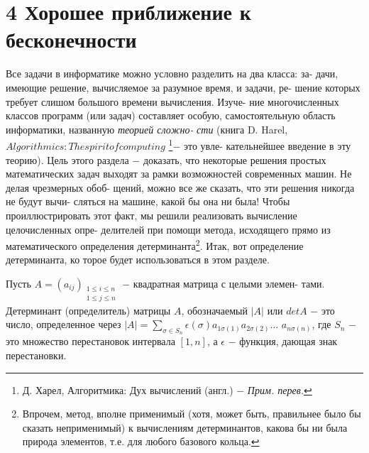 \section{4 Хорошее приближение к бесконечности}
\noindent
Все задачи в информатике можно условно разделить на два класса: за-\linebreak
дачи, имеющие решение, вычисляемое за разумное время, и задачи, ре-\linebreak
шение которых требует слишом большого времени вычисления. Изуче-\linebreak
ние многочисленных классов программ (или задач) составляет особую,\linebreak
самостоятельную область информатики,  названную \textit{теорией сложно-}\linebreak
\textit{сти} (книга D. Harel, $Algorithmics: The spirit of computing$
\footnote{
Д. Харел, Алгоритмика: Дух вычислений (англ.) $-$ \textit{Прим. перев.}}$-$ это увле-\linebreak
кательнейшее введение в эту теорию). Цель этого раздела $-$ доказать,\linebreak
что  некоторые  решения  простых  математических  задач  выходят  за\linebreak
рамки возможностей современных машин. Не делая чрезмерных обоб-\linebreak
щений, можно все же сказать, что эти решения никогда не будут вычи-\linebreak
сляться на машине, какой бы она ни была! Чтобы проиллюстрировать\linebreak
этот факт,  мы  решили  реализовать  вычисление  целочисленных  опре-\linebreak
делителей при помощи метода, исходящего прямо из математического\linebreak
определения детерминанта\footnote{
Впрочем, метод, вполне применимый (хотя, может быть, правильнее было бы\linebreak
сказать неприменимый) к вычислениям детерминантов, какова бы ни была природа\linebreak
элементов, т.е. для любого базового кольца.}. Итак, вот определение детерминанта, ко­
торое будет использоваться в этом разделе.
\begin{determ}
\hspace*{15pt}Пусть $A=(a_{ij})_{\substack{1\leqslant{i}\leqslant{n}\\1\leqslant{j}\leqslant{n}}}$ $-$ квадратная матрица с целыми элемен-\linebreak
тами. Детерминант (определитель) матрицы $A$, обозначаемый $|A|$ или\linebreak
$det{A}$ $-$ это число, определенное через $|A|=\sum_{\sigma\in{S_n}}\epsilon(\sigma)a_{1{\sigma(1)}}a_{2\sigma(2)}...$\linebreak
$a_{n\sigma(n)}$, где $S_n$ $-$ это множество перестановок интервала $[1,n]$, а $\epsilon$ $-$\linebreak
функция, дающая знак перестановки.
\end{determ}
